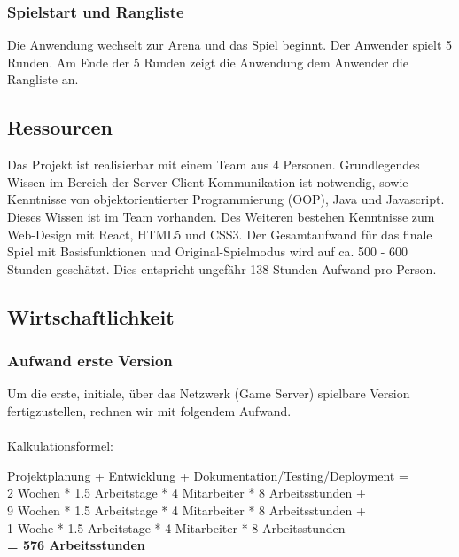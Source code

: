 \documentclass[11pt,ngerman]{article}
\begin{document}
	\subsubsection{Spielstart und Rangliste}
	Die Anwendung wechselt zur \Gls{Arena} und das Spiel beginnt. Der Anwender spielt 5 Runden. Am Ende der 5 Runden zeigt die Anwendung dem Anwender die Rangliste an.

    \subsection{Ressourcen}
    Das Projekt ist realisierbar mit einem Team aus 4 Personen. Grundlegendes Wissen im Bereich der Server-Client-Kommunikation ist notwendig, sowie Kenntnisse von objektorientierter Programmierung (\Gls{OOP}), Java und Javascript. Dieses Wissen ist im Team vorhanden. Des Weiteren bestehen Kenntnisse zum Web-Design mit React, HTML5 und CSS3.
    Der Gesamtaufwand für das finale Spiel mit Basisfunktionen und Original-Spielmodus wird auf ca. 500 - 600 Stunden geschätzt. Dies entspricht ungefähr 138 Stunden Aufwand pro Person.

    \subsection{Wirtschaftlichkeit}

    \subsubsection{Aufwand erste Version}
    Um die erste, initiale, über das Netzwerk (\Gls{Game Server}) spielbare Version fertigzustellen, rechnen wir mit folgendem Aufwand. \\
    \\
    Kalkulationsformel:
        \begin{center}
            \begin{itshape}
                Projektplanung + Entwicklung + Dokumentation/Testing/Deployment = \\
                \vspace{0.5em}
                2 Wochen * 1.5 Arbeitstage * 4 Mitarbeiter * 8 Arbeitsstunden + \\
                \vspace{0.5em}
                9 Wochen * 1.5 Arbeitstage * 4 Mitarbeiter * 8 Arbeitsstunden + \\
                \vspace{0.5em}
                1 Woche * 1.5 Arbeitstage * 4 Mitarbeiter * 8 Arbeitsstunden \\
                \vspace{0.5em}
                \textbf{= 576 Arbeitsstunden}
            \end{itshape}
        \end{center}
\end{document}
